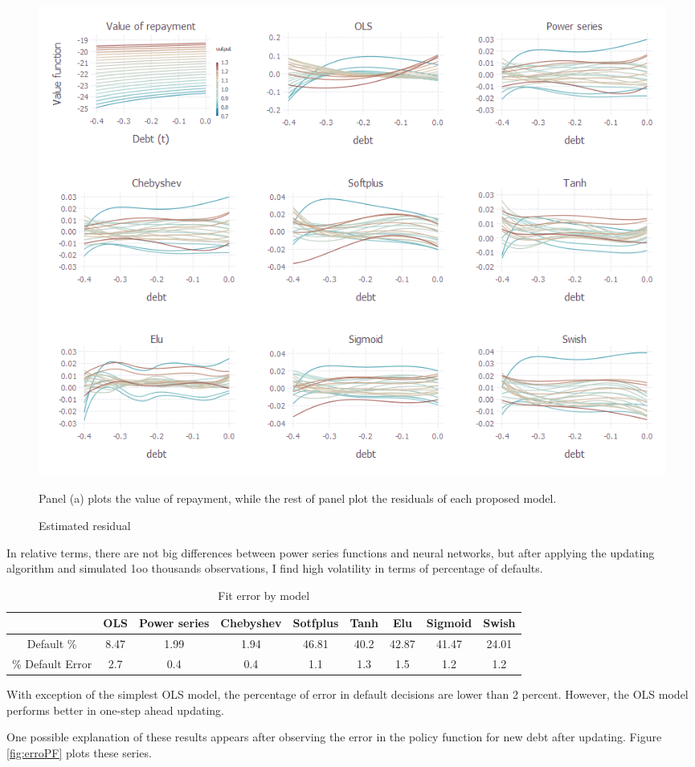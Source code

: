 \documentclass[12pt, a4paper]{article}
\begin{document}
\begin{figure}[!hbt]
	\centering
	\caption{Estimated residual}
	\includegraphics[scale=0.5]{../Plots/res1.png}
	\begin{minipage}{0.85\textwidth}
	{\scriptsize Panel (a)  plots the value of repayment, while the rest of panel plot the residuals of each proposed model.\par}
	\end{minipage}
\end{figure}
\par In relative terms, there are not big differences between power series functions and neural networks, but after applying the updating algorithm and simulated 1oo thousands observations, I find high volatility in terms of percentage of defaults.
\begin{table}[!hbt]
	\centering
	\caption{Fit error by model}
	\vspace{3mm}
	\begin{tabular}{|c|cccccccc|}
		\hline
		& OLS&Power series& Chebyshev&Sotfplus&Tanh&Elu&Sigmoid&Swish\\
		\hline
		Default \%&  8.47 & 1.99 & 1.94 & 46.81 & 40.2 & 42.87 & 41.47 & 24.01 \\
		\% Default Error& 2.7 & 0.4 & 0.4 &1.1& 1.3&1.5&1.2&1.2\\
		\hline
	\end{tabular}
	\label{tab:1}
\end{table}
With exception of the simplest OLS model, the percentage of error in default decisions are lower than 2 percent. However, the OLS model performs better in one-step ahead updating. 
\par One possible explanation of these results appears after observing the error in the policy function for  new debt after updating. Figure \ref{fig:erroPF} plots these series.
\end{document}
